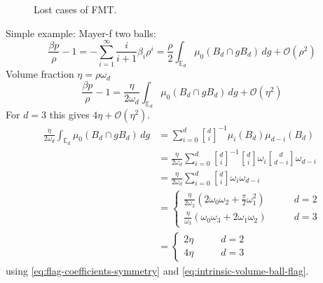 \documentclass[11pt]{report}
\begin{document}
\begin{figure}
  \missingfigure[figwidth=\linewidth]{}
  \caption{Lost cases of FMT.}
  \label{fig:lost-cases}
\end{figure}

Simple example: Mayer-f two balls:
\begin{equation}
  \frac{\beta p}{\rho} - 1 =
  - \sum_{i=1}^\infty \frac{i}{i+1} \beta_i \rho^i =
  \frac{\rho}{2} \int_{\mathbb{E}_d} \mu_0 (B_d \cap g B_d) \, dg
  + \mathcal{O}(\rho^2)
\end{equation}
Volume fraction $\eta = \rho \omega_d$
\begin{equation}
  \frac{\beta p}{\rho} - 1 =
  \frac{\eta}{2 \omega_d}
  \int_{\mathbb{E}_d} \mu_0 (B_d \cap g B_d) \, dg
  + \mathcal{O}(\eta^2)
\end{equation}
For $d = 3$ this gives $4\eta + \mathcal{O}(\eta^2)$.
\begin{align*}
  \frac{\eta}{2 \omega_d}
  \int_{\mathbb{E}_d} \mu_0 (B_d \cap g B_d) \, dg &=
  \sum_{i=0}^{d}
  {d \brack i}^{-1}
  \mu_i(B_d) \mu_{d-i}(B_d) \\
  &=
  \frac{\eta}{2 \omega_d}
  \sum_{i=0}^{d}
  {d \brack i}^{-1}
  {d \brack i} \omega_i
  {d \brack d-i} \omega_{d-i} \\
  &=
  \frac{\eta}{2 \omega_d}
  \sum_{i=0}^{d}
  {d \brack i} \omega_i \omega_{d-i} \\
  &=
  \begin{cases}
    \frac{\eta}{2 \omega_2}
    (2 \omega_0 \omega_2 + \frac{\pi}{2} \omega_1^2)
    & \qquad d=2 \\
    \frac{\eta}{\omega_3}
    (\omega_0 \omega_3 + 2 \omega_1 \omega_2)
    & \qquad d=3
  \end{cases} \\
  &=
  \begin{cases}
    2 \eta & \qquad d=2 \\
    4 \eta & \qquad d=3
  \end{cases}
\end{align*}
using \eqref{eq:flag-coefficients-symmetry} and \eqref{eq:intrinsic-volume-ball-flag}.
\begin{equation*}
\end{equation*}
\end{document}
